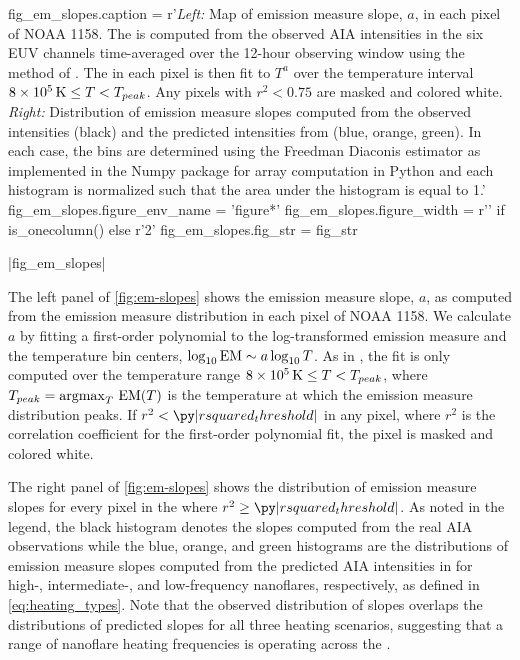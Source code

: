 \begin{pycode}[manager_em]
fig_em_slopes.caption = r'\textit{Left:} Map of emission measure slope, $a$, in each pixel of \AR{} NOAA 1158. The \dem{} is computed from the observed AIA intensities in the six EUV channels time-averaged over the 12-hour observing window using the method of \citet{hannah_differential_2012}. The \dem{} in each pixel is then fit to $T^a$ over the temperature interval $8\times10^5\,\textup{K}\le T < T_{peak}$. Any pixels with $r^2<0.75$ are masked and colored white. \textit{Right:} Distribution of emission measure slopes computed from the observed intensities (black) and the predicted intensities from  (blue, orange, green). In each case, the bins are determined using the Freedman Diaconis estimator \citep{freedman_histogram_1981} as implemented in the Numpy package for array computation in Python \citep{oliphant_guide_2006} and each histogram is normalized such that the area under the histogram is equal to 1.'
fig_em_slopes.figure_env_name = 'figure*'
fig_em_slopes.figure_width = r'\columnwidth' if is_onecolumn() else r'2\columnwidth'
fig_em_slopes.fig_str = fig_str
\end{pycode}
\py[manager_em]|fig_em_slopes|

The left panel of \autoref{fig:em-slopes} shows the emission measure slope, $a$, as computed from the emission measure distribution in each pixel of \AR{} NOAA 1158. We calculate $a$ by fitting a first-order polynomial to the log-transformed emission measure and the temperature bin centers, $\log_{10}\textup{EM}\sim a\log_{10}T$. As in , the fit is only computed over the temperature range $8\times10^5\,\textup{K}\le T < T_{peak}$, where $T_{peak}=\operatorname*{argmax}_T\,\textup{EM}(T)$ is the temperature at which the emission measure distribution peaks. If $r^2<\py|rsquared_threshold|$ in any pixel, where $r^2$ is the correlation coefficient for the first-order polynomial fit, the pixel is masked and colored white.

The right panel of \autoref{fig:em-slopes} shows the distribution of emission measure slopes for every pixel in the \AR{} where $r^2\ge\py|rsquared_threshold|$. As noted in the legend, the black histogram denotes the slopes computed from the real AIA observations while the blue, orange, and green histograms are the distributions of emission measure slopes computed from the predicted AIA intensities in  for high-, intermediate-, and low-frequency nanoflares, respectively, as defined in \autoref{eq:heating_types}. Note that the observed distribution of slopes overlaps the distributions of predicted slopes for all three heating scenarios, suggesting that a range of nanoflare heating frequencies is operating across the \AR.

